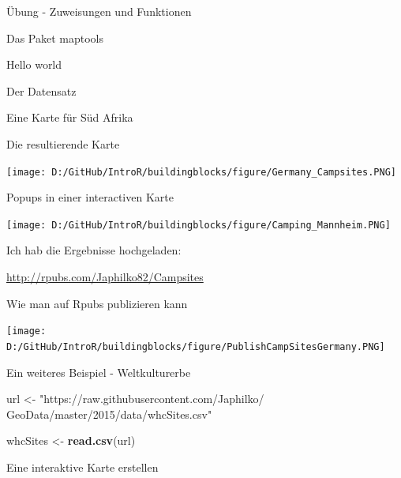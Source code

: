 \documentclass[ignorenonframetext,]{beamer}
\newenvironment{Shaded}{\begin{snugshade}}{\end{snugshade}}
\newcommand{\KeywordTok}[1]{\textcolor[rgb]{0.26,0.66,0.93}{\textbf{#1}}}
\newcommand{\NormalTok}[1]{\textcolor[rgb]{0.74,0.68,0.62}{#1}}
\newcommand{\StringTok}[1]{\textcolor[rgb]{0.02,0.61,0.04}{#1}}
\begin{document}
\begin{frame}[fragile]{Übung - Zuweisungen und Funktionen}
\begin{frame}[fragile]{Das Paket maptools}
\begin{frame}[fragile]{Hello world}
\begin{frame}[fragile]{Der Datensatz}
\begin{frame}[fragile]{Eine Karte für Süd Afrika}
\begin{frame}{Die resultierende Karte}
\protect\hypertarget{die-resultierende-karte}{}

\texttt{[image: D:/GitHub/IntroR/buildingblocks/figure/Germany\_Campsites.PNG]}

\end{frame}

\begin{frame}{Popups in einer interactiven Karte}
\protect\hypertarget{popups-in-einer-interactiven-karte}{}

\texttt{[image: D:/GitHub/IntroR/buildingblocks/figure/Camping\_Mannheim.PNG]}

Ich hab die Ergebnisse hochgeladen:

\url{http://rpubs.com/Japhilko82/Campsites}

\end{frame}

\begin{frame}{Wie man auf Rpubs publizieren kann}
\protect\hypertarget{wie-man-auf-rpubs-publizieren-kann}{}

\texttt{[image: D:/GitHub/IntroR/buildingblocks/figure/PublishCampSitesGermany.PNG]}

\end{frame}

\begin{frame}[fragile]{Ein weiteres Beispiel - Weltkulturerbe}
\protect\hypertarget{ein-weiteres-beispiel---weltkulturerbe}{}

\begin{Shaded}
\begin{Highlighting}[]
\NormalTok{url <-}\StringTok{ "https://raw.githubusercontent.com/Japhilko/}
\StringTok{GeoData/master/2015/data/whcSites.csv"}

\NormalTok{whcSites <-}\StringTok{ }\KeywordTok{read.csv}\NormalTok{(url) }
\end{Highlighting}
\end{Shaded}

\end{frame}

\begin{frame}[fragile]{Eine interaktive Karte erstellen}
\protect\hypertarget{eine-interaktive-karte-erstellen}{}


\end{frame}
\end{frame}
\end{frame}
\end{frame}
\end{frame}
\end{frame}
\end{document}
